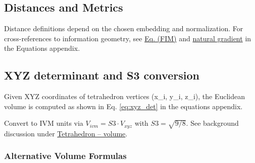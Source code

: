 \documentclass[
  10pt,
]{article}
\begin{document}
\hypertarget{distances-and-metrics}{%
\subsection{Distances and Metrics}\label{distances-and-metrics}}

Distance definitions depend on the chosen embedding and normalization.
For cross-references to information geometry, see
\href{08_equations_appendix.md\#eq:fim}{Eq. (FIM)} and
\href{08_equations_appendix.md\#eq:natgrad}{natural gradient} in the
Equations appendix.

\hypertarget{sec:xyz_conversion}{%
\subsection{XYZ determinant and S3
conversion}\label{sec:xyz_conversion}}

Given XYZ coordinates of tetrahedron vertices (x\_i, y\_i, z\_i), the
Euclidean volume is computed as shown in Eq. \eqref{eq:xyz_det} in the
equations appendix.

Convert to IVM units via \(V_{ivm} = S3 \cdot V_{xyz}\) with
\(S3=\sqrt{9/8}\). See background discussion under
\href{https://en.wikipedia.org/wiki/Tetrahedron\#Volume}{Tetrahedron --
volume}.

\hypertarget{alternative-volume-formulas}{%
\subsubsection{Alternative Volume
Formulas}\label{alternative-volume-formulas}}
\end{document}

